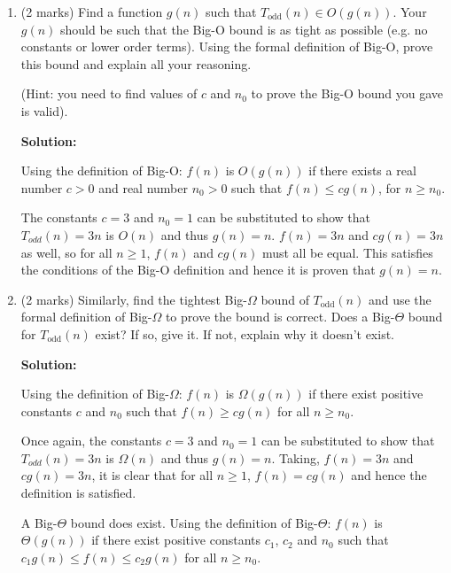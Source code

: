 \documentclass[a4,13pt]{extarticle}
\newenvironment{Solution}{\color{blue}\textbf{Solution:}}{}
\begin{document}
\begin{enumerate}
\begin{enumerate}
			\medskip
	      	      	      	                  
	      	\item (2 marks) Find a function $g(n)$ such that $T_{\text{odd}}(n)\in O(g(n))$. Your $g(n)$ should be such that the Big-O bound is as tight as possible (e.g. no constants or lower order terms). Using the formal definition of Big-O, prove this bound and explain all your reasoning. 
	      	      	      	                  
	      	(Hint: you need to find values of $c$ and $n_0$ to prove the Big-O bound you gave is valid).
	      	      
			\begin{Solution}

				Using the definition of Big-O: $f(n)$ is $O(g(n))$ if there exists a real number $c > 0$ and real number $n_0 > 0$ such that $f(n) \leq cg(n)$, for $n \geq n_0$.

				The constants $c = 3$ and $n_0 = 1$ can be substituted to show that $T_{odd}(n) = 3n$ is $O(n)$ and thus $g(n) = n$. $f(n) = 3n$ and $cg(n) = 3n$ as well, so for all $n \geq 1$, $f(n)$ and $cg(n)$ must all be equal. This satisfies the conditions of the Big-O definition and hence it is proven that $g(n) = n$.
			\end{Solution}

			\medskip
	      	      	      	                  
	      	\item (2 marks) Similarly, find the tightest Big-$\Omega$ bound of $T_{\text{odd}}(n)$ and use the formal definition of Big-$\Omega$ to prove the bound is correct. Does a Big-$\Theta$ bound for $T_{\text{odd}}(n)$ exist? If so, give it. If not, explain why it doesn't exist.
	      	
			\begin{Solution}

				Using the definition of Big-$\Omega$: $f(n)$ is $\Omega(g(n))$ if there exist positive constants $c$ and $n_0$ such that $f(n) \geq cg(n)$ for all $n \geq n_0$.

				Once again, the constants $c = 3$ and $n_0 = 1$ can be substituted to show that $T_{odd}(n) = 3n$ is $\Omega(n)$ and thus $g(n) = n$. Taking, $f(n) = 3n$ and $cg(n) = 3n$, it is clear that for all $n \geq 1$, $f(n) = cg(n)$ and hence the definition is satisfied.
				
				\medskip

				A Big-$\Theta$ bound does exist. Using the definition of Big-$\Theta$: $f(n)$ is $\Theta(g(n))$ if there exist positive constants $c_1$, $c_2$ and $n_0$ such that $c_1g(n) \leq f(n) \leq c_2g(n)$ for all $n \geq n_0$.


\end{Solution}
\end{enumerate}
\end{enumerate}
\end{document}
